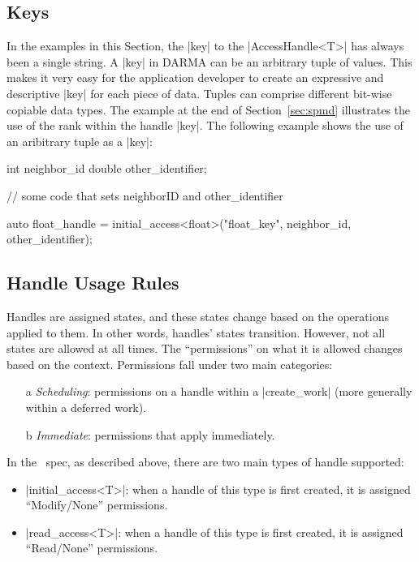 \subsection{Keys}
\label{subsec:keys}
In the examples in this Section, the |key| to the
|AccessHandle<T>| has always been a single string. 
A |key| in DARMA 
can be an arbitrary \gls{tuple} of values.  This 
makes it very easy for the application developer to create an expressive
and descriptive |key| for each piece of data.  Tuples can comprise
different bit-wise copiable data types.  The example at the end of
Section~\ref{sec:spmd} illustrates the use of the \gls{rank} within the handle
|key|.  The following example shows the use of an
aribitrary \gls{tuple} as a |key|:
\begin{CppCode}
  int neighbor_id
  double other_identifier;

  // some code that sets neighborID and other_identifier
  
  auto float_handle = initial_access<float>("float_key", 
                                            neighbor_id, 
                                            other_identifier);
\end{CppCode}


\subsection{Handle Usage Rules}
\label{sec:handlerules}

Handles are assigned states, and these states change 
based on the operations applied to them. In other words, 
handles' states transition. However, not all states 
are allowed at all times. The ``permissions'' on 
what it is allowed changes based on the context. 
Permissions fall under two main categories: 
\begin{itemize}
\item[a] {\it Scheduling}: permissions on a handle 
within a |create_work| (more generally within a deferred work).
\item[b] {\it Immediate}: permissions that apply immediately.
\end{itemize}

In the \specVersion\ spec, as described above, there are two main types 
of handle supported:
\begin{itemize}
\item |initial_access<T>|: when a handle of 
this type is first created, it is assigned 
``Modify/None'' permissions.
%
\item |read_access<T>|: when a handle of 
this type is first created, it is assigned 
``Read/None'' permissions.
\end{itemize}


